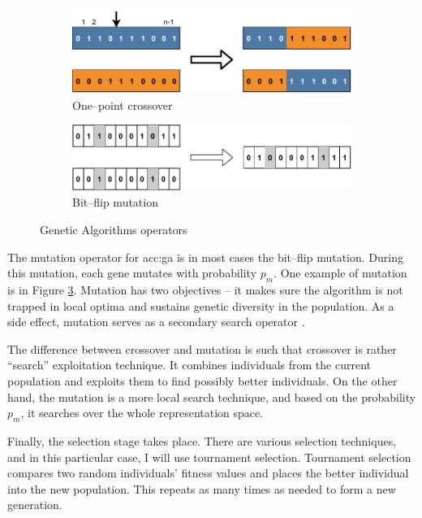 \begin{figure}
    \begin{subfigure}[b]{0.4\textwidth}
        \includegraphics[width=\textwidth]{img/master_onepointcrossover.pdf}
        \caption{One--point crossover}
        \label{fig:gaonepointcrossover}
    \end{subfigure}
    \hfill
    \begin{subfigure}[b]{0.4\textwidth}
        \includegraphics[width=\textwidth]{img/master_bitflipmutation.pdf}
        \caption{Bit--flip mutation}
        \label{fig:bitflipmutation}
    \end{subfigure}
    \caption{Genetic Algorithms operators}
\end{figure}

The mutation operator for \acrshort{acc:ga} is in most cases the bit--flip mutation. During this mutation, each gene mutates with probability $p_m$. One example of mutation is in Figure \ref{fig:bitflipmutation}. Mutation has two objectives -- it makes sure the algorithm is not trapped in local optima and sustains genetic diversity in the population. As a side effect, mutation serves as a secondary search operator \citep{IntroToGA}.

The difference between crossover and mutation is such that crossover is rather \enquote{search} exploitation technique. It combines individuals from the current population and exploits them to find possibly better individuals. On the other hand, the mutation is a more local search technique, and based on the probability $p_m$, it searches over the whole representation space.

Finally, the selection stage takes place. There are various selection techniques, and in this particular case, I will use tournament selection. Tournament selection compares two random individuals' fitness values and places the better individual into the new population. This repeats as many times as needed to form a new generation.

